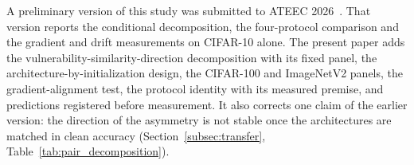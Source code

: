 A preliminary version of this study was submitted to ATEEC 2026~\cite{sahin2026behavioral}. That version reports the conditional decomposition, the four-protocol comparison and the gradient and drift measurements on CIFAR-10 alone. The present paper adds the vulnerability-similarity-direction decomposition with its fixed panel, the architecture-by-initialization design, the CIFAR-100 and ImageNetV2 panels, the gradient-alignment test, the protocol identity with its measured premise, and predictions registered before measurement. It also corrects one claim of the earlier version: the direction of the asymmetry is not stable once the architectures are matched in clean accuracy (Section~\ref{subsec:transfer}, Table~\ref{tab:pair_decomposition}).

